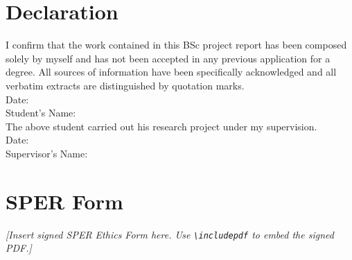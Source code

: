 \documentclass[12pt,a4paper]{report}
\begin{document}
\clearpage
{}
\clearpage
{}
\setcounter{page}{1}
\pagestyle{fancy}

\chapter*{Declaration}

I confirm that the work contained in this BSc project report has been composed solely by myself and has not been accepted in any previous application for a degree. All sources of information have been specifically acknowledged and all verbatim extracts are distinguished by quotation marks.\\[1cm]

\noindent Date: \hrulefill \\[0.5cm]
\noindent Student's Name: \hrulefill \\[2cm]

\noindent The above student carried out his research project under my supervision.\\[1cm]

\noindent Date: \hrulefill \\[0.5cm]
\noindent Supervisor's Name: \hrulefill

\clearpage

% 
\chapter*{SPER Form}
\textit{[Insert signed SPER Ethics Form here. Use \texttt{\textbackslash includepdf} to embed the signed PDF.]}
\clearpage

\end{document}
